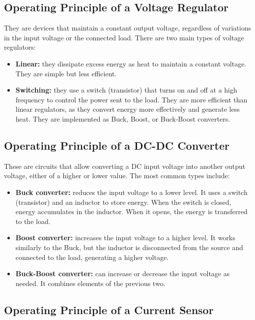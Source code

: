 \subsection{Operating Principle of a Voltage Regulator}

They are devices that maintain a constant output voltage, regardless of variations in the input voltage or the connected load. There are two main types of voltage regulators:

\begin{itemize}
  \item \textbf{Linear:} they dissipate excess energy as heat to maintain a constant voltage. They are simple but less efficient.
  \item \textbf{Switching:} they use a switch (transistor) that turns on and off at a high frequency to control the power sent to the load. They are more efficient than linear regulators, as they convert energy more effectively and generate less heat. They are implemented as Buck, Boost, or Buck-Boost converters.
\end{itemize}

\subsection{Operating Principle of a DC-DC Converter}

These are circuits that allow converting a DC input voltage into another output voltage, either of a higher or lower value. The most common types include:

\begin{itemize}
  \item \textbf{Buck converter:} reduces the input voltage to a lower level. It uses a switch (transistor) and an inductor to store energy. When the switch is closed, energy accumulates in the inductor. When it opens, the energy is transferred to the load.
  \item \textbf{Boost converter:} increases the input voltage to a higher level. It works similarly to the Buck, but the inductor is disconnected from the source and connected to the load, generating a higher voltage.
  \item \textbf{Buck-Boost converter:} can increase or decrease the input voltage as needed. It combines elements of the previous two.
\end{itemize}

\subsection{Operating Principle of a Current Sensor}

